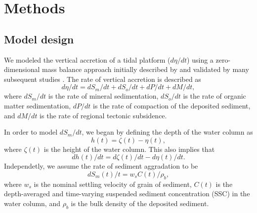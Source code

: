 \section{Methods}

\subsection{Model design}

We modeled the vertical accretion of a tidal platform ($d\eta/dt$) using a zero-dimensional mass balance approach initially described by \citet{kroneMethodSimulatingMarsh1987} and validated by many subsequent studies \citep{allenSaltmarshGrowthStratification1990, frenchNumericalSimulationVertical1993, temmermanModellingLongtermTidal2003,temmermanModellingEstuarineVariations2004}. The rate of vertical accretion is described as
\begin{equation}\label{eq1}
	d\eta/dt = dS_m/dt + dS_o/dt + dP/dt + dM/dt,
\end{equation}
where $dS_m/dt$ is the rate of mineral sedimentation, $dS_o/dt$ is the rate of organic matter sedimentation, $dP/dt$ is the rate of compaction of the deposited sediment, and $dM/dt$ is the rate of regional tectonic subsidence.

In order to model $dS_m/dt$, we began by defining the depth of the water column as
\begin{equation}\label{eq2}
	h(t) = \zeta(t) - \eta(t),
\end{equation}
where $\zeta(t)$ is the height of the water column. This also implies that
\begin{equation}\label{eq3}
	dh(t)/dt = d\zeta(t)/dt - d\eta(t)/dt.
\end{equation}
Independetly, we assume the rate of sediment aggradation to be
\begin{equation}\label{eq4}
	dS_m(t)/t = w_s C(t)/\rho_b,
\end{equation}
where $w_s$ is the nominal settling velocity of grain of sediment, $C(t)$ is the depth-averaged and time-varying suspended sediment concentration (SSC) in the water column, and $\rho_b$ is the bulk density of the deposited sediment.

